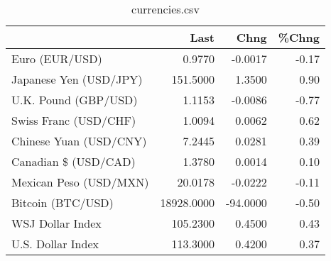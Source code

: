 \documentclass{article}%
\begin{document}
%


\begin{table}[htbp]%
\caption{currencies.csv}%
\centering%
\begin{adjustbox}{width=1\textwidth}%
\begin{tabular}{lrrr}
\toprule
                       &       Last &     Chng &  \%Chng \\
\midrule
        Euro (EUR/USD) &     0.9770 &  -0.0017 &  -0.17 \\
Japanese Yen (USD/JPY) &   151.5000 &   1.3500 &   0.90 \\
  U.K. Pound (GBP/USD) &     1.1153 &  -0.0086 &  -0.77 \\
 Swiss Franc (USD/CHF) &     1.0094 &   0.0062 &   0.62 \\
Chinese Yuan (USD/CNY) &     7.2445 &   0.0281 &   0.39 \\
  Canadian \$ (USD/CAD) &     1.3780 &   0.0014 &   0.10 \\
Mexican Peso (USD/MXN) &    20.0178 &  -0.0222 &  -0.11 \\
     Bitcoin (BTC/USD) & 18928.0000 & -94.0000 &  -0.50 \\
      WSJ Dollar Index &   105.2300 &   0.4500 &   0.43 \\
     U.S. Dollar Index &   113.3000 &   0.4200 &   0.37 \\
\bottomrule
\end{tabular}
%
\end{adjustbox}%
\end{table}

%
\end{document}
